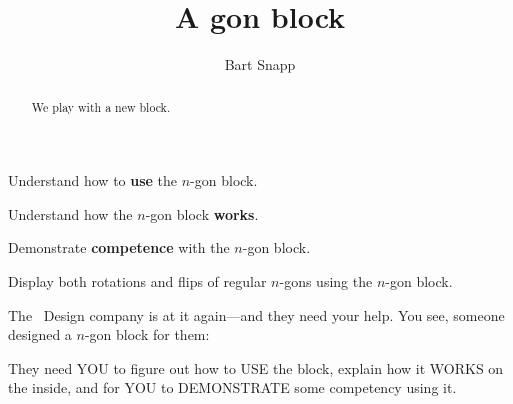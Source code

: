 \documentclass[noauthor,nooutcomes,12pt,handout]{ximera}
\title{A gon block}
\author{Bart Snapp}
\begin{document}
\begin{abstract}
  We play with a new block.
\end{abstract}
\maketitle

\begin{listOutcomes}
\item Understand how to \textbf{use} the $n$-gon block.
\item Understand how the $n$-gon block \textbf{works}.
\item Demonstrate \textbf{competence} with the $n$-gon block.
\item Display both rotations and flips of regular $n$-gons using the
  $n$-gon block.
\end{listOutcomes}



The \mooculus\ Design company is at it again---and they need your
help. You see, someone designed a $n$-gon block for them:


They need YOU to figure out how to USE the block, explain how it WORKS
on the inside, and for YOU to DEMONSTRATE some competency using it.
\mynewpage
\end{document}
